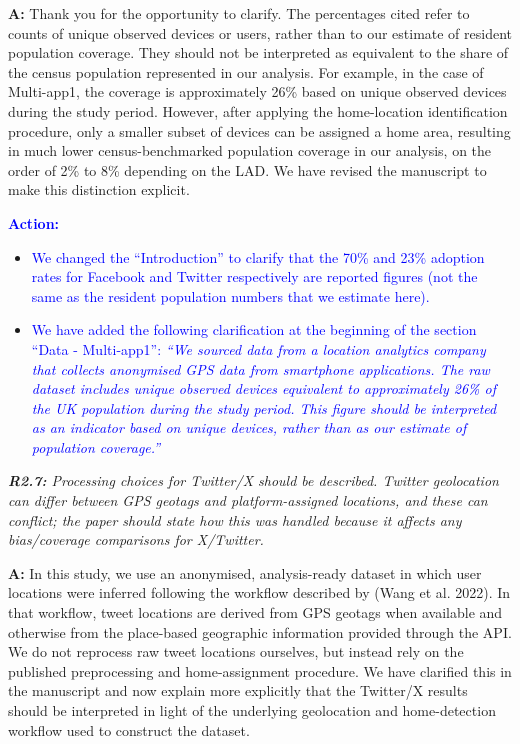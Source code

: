 \documentclass[
  letterpaper,
  DIV=11,
  numbers=noendperiod]{scrartcl}
\begin{document}
\setlength{\leftskip}{0.5cm}\textbf{A:} Thank you for the opportunity to
clarify. The percentages cited refer to counts of unique observed
devices or users, rather than to our estimate of resident population
coverage. They should not be interpreted as equivalent to the share of
the census population represented in our analysis. For example, in the
case of Multi-app1, the coverage is approximately 26\% based on unique
observed devices during the study period. However, after applying the
home-location identification procedure, only a smaller subset of devices
can be assigned a home area, resulting in much lower census-benchmarked
population coverage in our analysis, on the order of 2\% to 8\%
depending on the LAD. We have revised the manuscript to make this
distinction explicit.

\setlength{\leftskip}{0.5cm}\textcolor{blue}{\textbf{Action:} }

\vspace{-3mm} \begin{itemize}[noitemsep, topsep=0pt]
\item \textcolor{blue}{We changed the ``Introduction'' to clarify that the 70\% and 23\% adoption rates for Facebook and Twitter respectively are reported figures (not the same as the resident population numbers that we estimate here).}
\item \textcolor{blue}{We have added the following clarification at the beginning of the section ``Data - Multi-app1'': \textit{``We sourced data from a location analytics company that collects anonymised GPS data from smartphone applications. The raw dataset includes unique observed devices equivalent to approximately 26\% of the UK population during the study period. This figure should be interpreted as an indicator based on unique devices, rather than as our estimate of population coverage.''}}
\end{itemize}

\setlength{\leftskip}{0cm}\textit{\textbf{R2.7:} Processing choices for Twitter/X should be described. Twitter geolocation can differ between GPS geotags and platform-assigned locations, and these can conflict; the paper should state how this was handled because it affects any bias/coverage comparisons for X/Twitter.}

\setlength{\leftskip}{0.5cm}\textbf{A:} In this study, we use an
anonymised, analysis-ready dataset in which user locations were inferred
following the workflow described by (Wang et al. 2022). In that
workflow, tweet locations are derived from GPS geotags when available
and otherwise from the place-based geographic information provided
through the API. We do not reprocess raw tweet locations ourselves, but
instead rely on the published preprocessing and home-assignment
procedure. We have clarified this in the manuscript and now explain more
explicitly that the Twitter/X results should be interpreted in light of
the underlying geolocation and home-detection workflow used to construct
the dataset.
\end{document}
